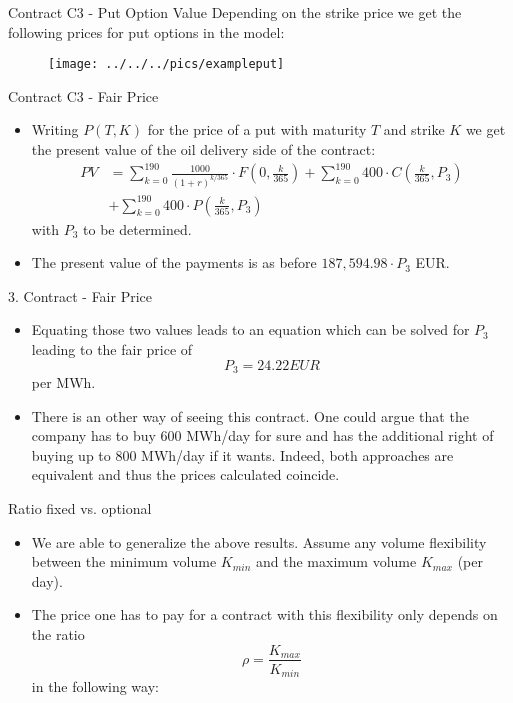 {Contract C3  - Put Option Value}
Depending on the strike price we get the following prices for put options in the model:
\begin{figure}
	\centering
		\texttt{[image: ../../../pics/exampleput]}
	\label{fig:exampleput}
\end{figure}

{Contract C3 - Fair Price}
\begin{itemize}
\item<1-> Writing $P(T,K)$ for the price of a put with maturity $T$ and strike $K$ we get the present value of the oil delivery side of the contract:
\begin{align*}
	PV &= \sum_{k=0}^{190} \frac{1000}{(1+r)^{k/365}} \cdot F(0,\frac k {365}) + \sum_{k=0}^{190} 400 \cdot C(\frac k {365},P_3)\\
	 &+ \sum_{k=0}^{190} 400 \cdot P(\frac k {365},P_3)
\end{align*}
with $P_3$ to be determined.
\item<2-> The present value of the payments is as before $187,594.98 \cdot P_3$ EUR.
\end{itemize}

{3. Contract - Fair Price}
\begin{itemize}
\item<1-> Equating those two values leads to an equation which can be solved for $P_3$ leading to the fair price of
$$
	P_3 = 24.22 EUR
$$
per MWh.
\item<2->
There is an other way of seeing this contract. One could argue that the company has to buy 600 MWh/day for sure and has the additional right of buying up to 800 MWh/day if it wants. Indeed, both approaches are equivalent and thus the prices calculated coincide.
\end{itemize}


{Ratio fixed vs. optional}
\begin{itemize}
\item<1-> We are able to generalize the above results. Assume any volume flexibility between the minimum volume $K_{min}$ and the maximum volume $K_{max}$ (per day).
\item<2-> The price one has to pay for a contract with this flexibility only depends on the ratio
$$
	\rho = \frac{K_{max}}{K_{min}}
$$
in the following way:
\end{itemize}

